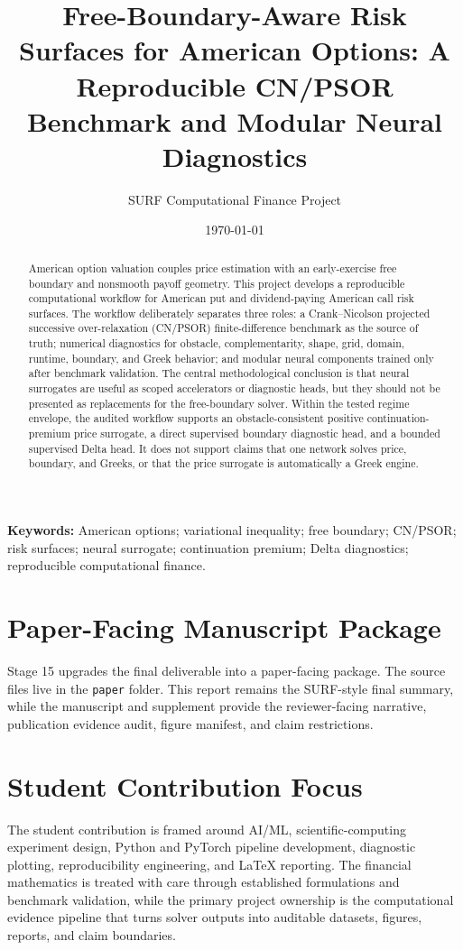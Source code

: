 \documentclass[11pt]{article}
\title{Free-Boundary-Aware Risk Surfaces for American Options: A Reproducible CN/PSOR Benchmark and Modular Neural Diagnostics}
\author{SURF Computational Finance Project}
\date{\today}
\begin{document}
\maketitle

\begin{abstract}
American option valuation couples price estimation with an early-exercise free boundary and nonsmooth payoff geometry. This project develops a reproducible computational workflow for American put and dividend-paying American call risk surfaces. The workflow deliberately separates three roles: a Crank--Nicolson projected successive over-relaxation (CN/PSOR) finite-difference benchmark as the source of truth; numerical diagnostics for obstacle, complementarity, shape, grid, domain, runtime, boundary, and Greek behavior; and modular neural components trained only after benchmark validation. The central methodological conclusion is that neural surrogates are useful as scoped accelerators or diagnostic heads, but they should not be presented as replacements for the free-boundary solver. Within the tested regime envelope, the audited workflow supports an obstacle-consistent positive continuation-premium price surrogate, a direct supervised boundary diagnostic head, and a bounded supervised Delta head. It does not support claims that one network solves price, boundary, and Greeks, or that the price surrogate is automatically a Greek engine.
\end{abstract}

\textbf{Keywords:} American options; variational inequality; free boundary; CN/PSOR; risk surfaces; neural surrogate; continuation premium; Delta diagnostics; reproducible computational finance.

\section*{Paper-Facing Manuscript Package}

Stage 15 upgrades the final deliverable into a paper-facing package. The source files live in the \texttt{paper} folder. This report remains the SURF-style final summary, while the manuscript and supplement provide the reviewer-facing narrative, publication evidence audit, figure manifest, and claim restrictions.

\section*{Student Contribution Focus}

The student contribution is framed around AI/ML, scientific-computing experiment design, Python and PyTorch pipeline development, diagnostic plotting, reproducibility engineering, and LaTeX reporting. The financial mathematics is treated with care through established formulations and benchmark validation, while the primary project ownership is the computational evidence pipeline that turns solver outputs into auditable datasets, figures, reports, and claim boundaries.
\end{document}

